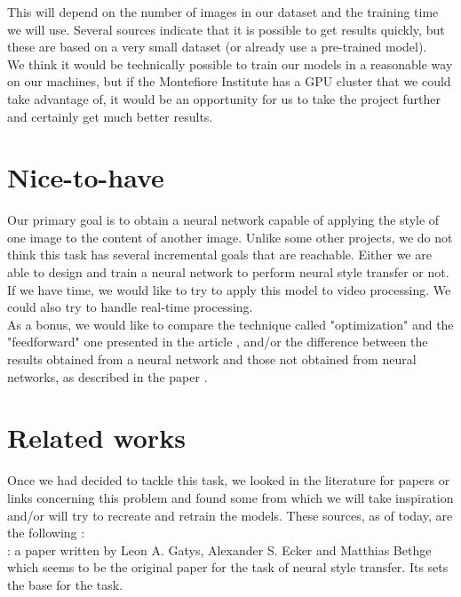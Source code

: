 \documentclass[twocolumn,superscriptaddress,aps]{revtex4-1}
\begin{document}
    This will depend on the number of images in our dataset and the training time we will use. Several sources indicate that it is possible to get results quickly, but these are based on a very small dataset (or already use a pre-trained model).\\
    
    We think it would be technically possible to train our models in a reasonable way on our machines, but if the Montefiore Institute has a GPU cluster that we could take advantage of, it would be an opportunity for us to take the project further and certainly get much better results.
    
    \section{Nice-to-have}
    
    Our primary goal is to obtain a neural network capable of applying the style of one image to the content of another image. Unlike some other projects, we do not think this task has several incremental goals that are reachable. Either we are able to design and train a neural network to perform neural style transfer or not.\\
    
    If we have time, we would like to try to apply this model to video processing. We could also try to handle real-time processing.\\
    
    As a bonus, we would like to compare the technique called "optimization" and the "feedforward" one presented in the article \cite{medium-neural-artistic-style-transfer}, and/or the difference between the results obtained from a neural network and those not obtained from neural networks, as described in the paper \cite{1705-04058}.
    
    \section{Related works}
    
    Once we had decided to tackle this task, we looked in the literature for papers or links concerning this problem and found some from which we will take inspiration and/or will try to recreate and retrain the models. These sources, as of today, are the following : \\
    
    \cite{1508-06576} : a paper written by Leon A. Gatys, Alexander S. Ecker and Matthias Bethge which seems to be the original paper for the task of neural style transfer. Its sets the base for the task.\\
    
\end{document}
